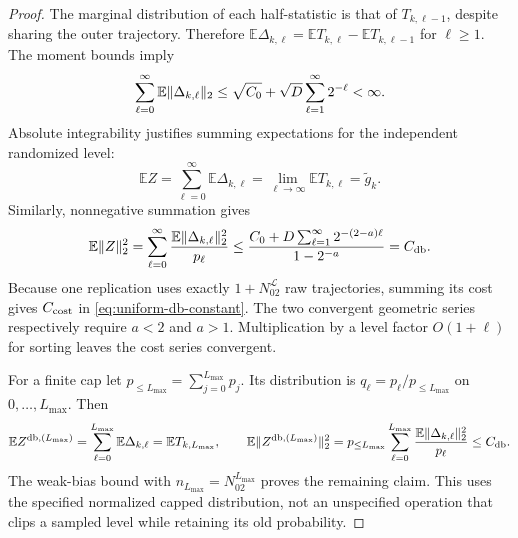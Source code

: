 \documentclass[11pt]{article}
\newcommand{\E}{\mathbb E}
\newcommand{\1}{\mathbf 1}
\DeclarePairedDelimiter{\norm}{\lVert}{\rVert}
\newcommand{\db}{\mathrm{db}}
\begin{document}
\begin{proof}
The marginal distribution of each half-statistic is that of $T_{k,\ell-1}$, despite sharing the outer trajectory. Therefore
$\E\Delta_{k,\ell}=\E T_{k,\ell}-\E T_{k,\ell-1}$ for $\ell\ge1$. The moment bounds imply
\[
 \sum_{\ell=0}^\infty\E\norm{\Delta_{k,\ell}}_2
 \le\sqrt{C_0}+\sqrt D\sum_{\ell=1}^\infty2^{-\ell}<\infty.
\]
Absolute integrability justifies summing expectations for the independent randomized level:
\[
 \E Z=\sum_{\ell=0}^\infty\E\Delta_{k,\ell}
 =\lim_{\ell\to\infty}\E T_{k,\ell}=\widetilde g_k.
\]
Similarly, nonnegative summation gives
\[
 \E\norm{Z}_2^2
 =\sum_{\ell=0}^\infty\frac{\E\norm{\Delta_{k,\ell}}_2^2}{p_\ell}
 \le\frac{C_0+D\sum_{\ell=1}^\infty2^{-(2-a)\ell}}{1-2^{-a}}
 =C_{\db}.
\]
Because one replication uses exactly $1+N_02^{\mathcal L}$ raw trajectories, summing its cost gives $C_{\rm cost}$ in \eqref{eq:uniform-db-constant}. The two convergent geometric series respectively require $a<2$ and $a>1$. Multiplication by a level factor $O(1+\ell)$ for sorting leaves the cost series convergent.

For a finite cap let $p_{\le L_{\max}}=\sum_{j=0}^{L_{\max}}p_j$. Its distribution is $q_\ell=p_\ell/p_{\le L_{\max}}$ on $0,\ldots,L_{\max}$. Then
\[
 \E Z^{\db,(L_{\max})}=\sum_{\ell=0}^{L_{\max}}\E\Delta_{k,\ell}=\E T_{k,L_{\max}},
 \qquad
 \E\norm{Z^{\db,(L_{\max})}}_2^2=p_{\le L_{\max}}\sum_{\ell=0}^{L_{\max}}
 \frac{\E\norm{\Delta_{k,\ell}}_2^2}{p_\ell}\le C_{\db}.
\]
The weak-bias bound with $n_{L_{\max}}=N_02^{L_{\max}}$ proves the remaining claim. This uses the specified normalized capped distribution, not an unspecified operation that clips a sampled level while retaining its old probability.
\end{proof}
\end{document}

